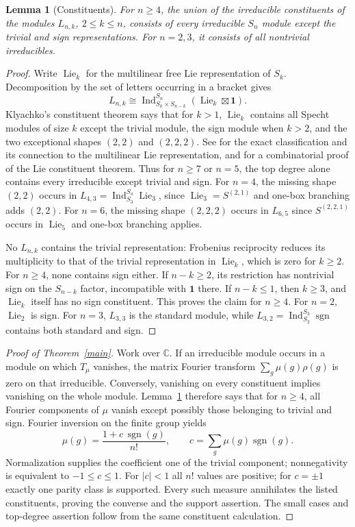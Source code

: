 \documentclass[11pt]{article}
\newtheorem{lemma}[theorem]{Lemma}
\newcommand{\Lie}{\operatorname{Lie}}
\newcommand{\sgn}{\operatorname{sgn}}
\begin{document}
\begin{lemma}[Constituents]\label{constituents}
For $n\ge4$, the union of the irreducible constituents of the modules
$L_{n,k}$, $2\le k\le n$, consists of every irreducible $S_n$ module
except the trivial and sign representations.
For $n=2,3$, it consists of all nontrivial irreducibles.
\end{lemma}
\begin{proof}
Write $\Lie_k$ for the multilinear free Lie representation of $S_k$.
Decomposition by the set of letters occurring in a bracket gives
\[
 L_{n,k}\cong
 \operatorname{Ind}_{S_k\times S_{n-k}}^{S_n}
       (\Lie_k\boxtimes\mathbf1).
\]
Klyachko's constituent theorem says that for $k>1$, $\Lie_k$ contains
all Specht modules of size $k$ except the trivial module, the sign
module when $k>2$, and the two exceptional shapes $(2,2)$ and
$(2,2,2)$. See \cite[Theorem 1.1, Theorem 1.2 and Remark 1.3]{swanson}
for the exact classification and its connection to the multilinear
Lie representation, and \cite{kovacs} for a combinatorial proof of
the Lie constituent theorem.
Thus for $n\ge7$ or $n=5$, the top degree alone contains every
irreducible except trivial and sign. For $n=4$, the missing shape
$(2,2)$ occurs in
$L_{4,3}=\operatorname{Ind}_{S_3}^{S_4}\Lie_3$, since
$\Lie_3=S^{(2,1)}$ and one-box branching adds $(2,2)$.
For $n=6$, the missing shape $(2,2,2)$ occurs in $L_{6,5}$ since
$S^{(2,2,1)}$ occurs in $\Lie_5$ and one-box branching applies.

No $L_{n,k}$ contains the trivial representation: Frobenius reciprocity
reduces its multiplicity to that of the trivial representation in
$\Lie_k$, which is zero for $k\ge2$.
For $n\ge4$, none contains sign either. If $n-k\ge2$, its restriction
has nontrivial sign on the $S_{n-k}$ factor, incompatible with
$\mathbf1$ there. If $n-k\le1$, then $k\ge3$, and $\Lie_k$ itself
has no sign constituent. This proves the claim for $n\ge4$.
For $n=2$, $\Lie_2$ is sign. For $n=3$, $L_{3,3}$ is the standard
module, while $L_{3,2}=\operatorname{Ind}_{S_2}^{S_3}\sgn$ contains
both standard and sign.
\end{proof}

\begin{proof}[Proof of Theorem~\ref{main}]
Work over $\mathbb C$. If an irreducible module occurs in a module on
which $T_\mu$ vanishes, the matrix Fourier transform
$\sum_g\mu(g)\rho(g)$ is zero on that irreducible. Conversely,
vanishing on every constituent implies vanishing on the whole module.
Lemma~\ref{constituents} therefore says that for $n\ge4$, all Fourier
components of $\mu$ vanish except possibly those belonging to trivial
and sign. Fourier inversion on the finite group yields
\[
 \mu(g)=\frac{1+c\,\sgn(g)}{n!},
 \qquad c=\sum_g\mu(g)\sgn(g).
\]
Normalization supplies the coefficient one of the trivial component;
nonnegativity is equivalent to $-1\le c\le1$. For $|c|<1$ all $n!$
values are positive; for $c=\pm1$ exactly one parity class is supported.
Every such measure annihilates the listed constituents, proving the
converse and the support assertion. The small cases and top-degree
assertion follow from the same constituent calculation.
\end{proof}
\end{document}
